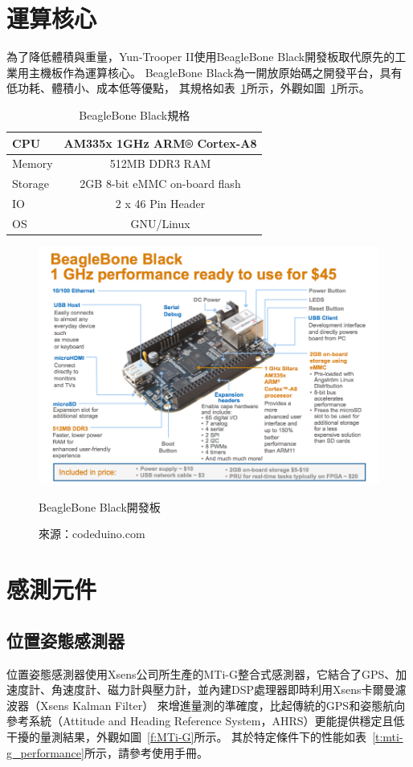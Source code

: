 \section{運算核心}
為了降低體積與重量，Yun-Trooper II使用BeagleBone Black開發板取代原先的工業用主機板作為運算核心。
BeagleBone Black為一開放原始碼之開發平台，具有低功耗、體積小、成本低等優點，
其規格如表~\ref{t:beagleboneblack-specs}所示，外觀如圖~\ref{f:beagleboneblack-specs}所示。
\begin{table}[h!]
	\centering
	\caption{BeagleBone Black規格}
	\label{t:beagleboneblack-specs}
	\begin{tabular}{ | l | c |}
		\hline
		CPU & AM335x 1GHz ARM® Cortex-A8 \\ \hline
		Memory & 512MB DDR3 RAM \\ \hline
		Storage & 2GB 8-bit eMMC on-board flash \\ \hline
		IO & 2 x 46 Pin Header \\ \hline 
		OS & GNU/Linux \\
		\hline
	\end{tabular}
\end{table}
\begin{figure}[h!]
	\centering
	\includegraphics[width=\textwidth]{figures/hardware/beagleboneblack-specs}
	\caption{BeagleBone Black開發板}
	\caption*{來源：codeduino.com}
	\label{f:beagleboneblack-specs}
\end{figure}

\section{感測元件}
\subsection{位置姿態感測器}
位置姿態感測器使用Xsens公司所生產的MTi-G整合式感測器，它結合了GPS、加速度計、角速度計、磁力計與壓力計，並內建DSP處理器即時利用Xsens卡爾曼濾波器（Xsens Kalman Filter）
來增進量測的準確度，比起傳統的GPS和姿態航向參考系統（Attitude and Heading Reference System，AHRS）更能提供穩定且低干擾的量測結果，外觀如圖~\ref{f:MTi-G}所示。
其於特定條件下的性能如表~\ref{t:mti-g_performance}所示，請參考使用手冊\cite{Xsens:2012:MTiG_Manual}。

